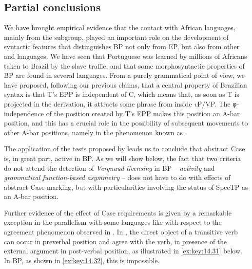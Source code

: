 \documentclass[output=paper]{langsci/langscibook}
\begin{document}
\subsection{Partial conclusions}\label{sec:key:14.4.3}

We have brought empirical evidence that the contact with African languages,
mainly from the  subgroup, played an important role on the development of
syntactic features that distinguishes \gls{BP} not only from \gls{EP}, but
also from other  and  languages. We have seen that
Portuguese was learned by millions of Africans taken to Brazil by the slave
traffic, and that some morphosyntactic properties of \gls{BP} are found in
several  languages. From a purely grammatical point of view, we have
proposed, following our previous claims, that a central property of Brazilian
syntax is that T’s \gls{EPP} is independent of C, which means that, as soon as
T is projected in the derivation, it attracts some phrase from inside
\emph{v}P/VP. The φ-independence of the position created by T’s \gls{EPP} makes
this position an A-bar position, and this has a crucial role in the possibility
of subsequent movements to other A-bar positions, namely in the phenomenon
known as .

The application of the tests proposed by \textcite{SheevanderWal2018} leads us
to conclude that abstract Case is, in great part, active in
\gls{BP}. As we will show below, the fact that two
criteria do not attend the detection of \emph{Vergnaud licensing} in
\gls{BP} – \emph{activity} and \emph{grammatical
function-based asymmetry} – does not have to do with effects of abstract Case
marking, but with particularities involving the status of SpecTP as an A-bar
position.

Further evidence of the effect of Case requirements is given by a remarkable
exception in the parallelism with some  languages like  with
respect to the agreement phenomenon observed in . In
, the direct object of a transitive verb can occur in preverbal
position and agree with the verb, in presence of the external argument in
post-verbal position, as illustrated in \eqref{ex:key:14.31} below. In \gls{BP}, as
shown in \eqref{ex:key:14.32}, this is impossible.
\end{document}
